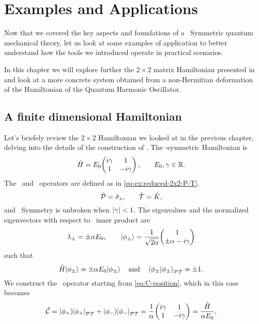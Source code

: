 \chapter{Examples and Applications}\label{ch:examples}
    Now that we covered the key aspects and foundations of a \PT\ Symmetric quantum mechanical theory, let us look at some examples of application to better understand how the tools we introduced operate in practical scenarios.
    
    In this chapter we will explore further the $2\times2$ matrix Hamiltonian presented in  and look at a more concrete system obtained from a non-Hermitian deformation of the Hamiltonian of the Quantum Harmonic Oscillator.
    \section{A finite dimensional Hamiltonian}
        Let's briefely review the $2\times2$ Hamiltonian we looked at in the previous chapter, delving into the details of the construction of \hC. The \PT-symmetric Hamiltonian is
        \begin{equation}
            \hH = E_0\! \pmqty{\dmat[1]{i\gamma, -i\gamma}}
            \mycomma \qquad
            E_0,\gamma \in \bbR
            \myperiod
        \end{equation}
        The \hP\ and \hT\ operators are defined as in \eqref{eq:ex:reduced-2x2-P-T},
        \begin{equation*}
            \mathcal{\hat{P}} = \hat{\sigma}_x \text{,} \qquad \mathcal{\hat{T}} = \hat{K}
            \text{,}
        \end{equation*}
        and \PT\ Symmetry is unbroken when $\abs{\gamma} < 1$. The eigenvalues and the normalized eigenvectors with respect to \PT\ inner product are
        \begin{equation*}
            \lambda_\pm = \pm \alpha E_0
            \mycomma
            \qquad
            \ket{\phi_\pm} = \frac{1}{\sqrt{2\alpha}} \!\pmqty{1 \\ \pm\alpha - i \gamma}
        \end{equation*}
        such that
        \begin{equation*}
            \hH \!\ket{\phi_\pm} = \pm \alpha E_0 \!\ket{\phi_\pm}
            \qand
            \braket{\phi_\pm}{\phi_\pm}_{\PT} = \pm 1
            \myperiod
        \end{equation*}
        We construct the \hC\ operator starting from \eqref{eq:C-position}, which in this case becomes
        \begin{equation}
            \hC = \dyad{\phi_+}{\phi_{+}}_{\PT} + \dyad{\phi_-}{\phi_-}_{\PT}
            = \frac{1}{\alpha} \!\pmqty{\dmat[1]{i\gamma, -i\gamma}}
            = \frac{\hH}{\alpha E_0}
            \mycomma
        \end{equation}
